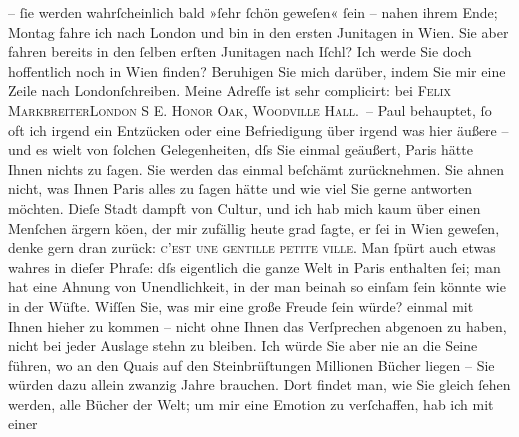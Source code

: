 \begin{ledgroupsized}[t]{13cm}
               – ſie werden wahrſcheinlich bald »ſehr ſchön geweſen« ſein – nahen ihrem Ende; Montag
               fahre ich nach London und bin in den ersten
               Junitagen in Wien. Sie aber fahren bereits in den
               ſelben erſten Junitagen nach Iſchl?\pend
           \pstart
           Ich werde Sie doch hoffentlich noch in Wien
               finden? Beruhigen {\pb}Sie mich darüber, indem Sie mir
               eine Zeile nach Londonſchreiben. Meine Adreſſe ist sehr complicirt: bei
                  \textsc{Felix MarkbreiterLondon S E. Honor Oak, Woodville Hall}. –\pend
           \pstart
           Paul behauptet, ſo oft ich irgend ein
               Entzücken oder eine Befriedigung über irgend was hier äußere – und es wi{\geminationm}elt von ſolchen Gelegenheiten, dſs Sie einmal ge{\pb}äußert, Paris
               hätte Ihnen nichts zu ſagen. Sie werden das einmal beſchämt zurücknehmen. Sie ahnen
               nicht, was Ihnen Paris alles zu ſagen hätte und
               wie viel Sie gerne antworten möchten. Dieſe Stadt dampft von Cultur, und ich hab mich
               kaum über einen Menſchen ärgern kö{\geminationn}en, der mir zufällig
               heute grad ſagte, er ſei in Wien geweſen, {\pb}denke gern dran zurück: \textsc{c’est une
                  gentille petite ville}. Man ſpürt auch etwas wahres in dieſer Phraſe: dſs
               eigentlich die ganze Welt in Paris enthalten ſei;
               man hat eine Ahnung von Unendlichkeit, in der man beinah so einſam ſein könnte wie in
               der Wüſte. Wiſſen Sie, was mir eine große Freude ſein würde? einmal mit Ihnen hieher
               zu kommen – nicht {\pb}ohne Ihnen das Verſprechen abgeno{\geminationm}en zu haben, nicht bei jeder Auslage stehn zu bleiben.
               Ich würde Sie aber nie an die Seine führen, wo an den Quais auf den Steinbrüſtungen
               Millionen Bücher liegen – Sie würden dazu allein zwanzig Jahre brauchen. Dort findet
               man, wie Sie gleich ſehen werden, alle Bücher der Welt; {\pb}um mir eine Emotion zu verſchaffen, hab ich mit einer

\end{ledgroupsized}
